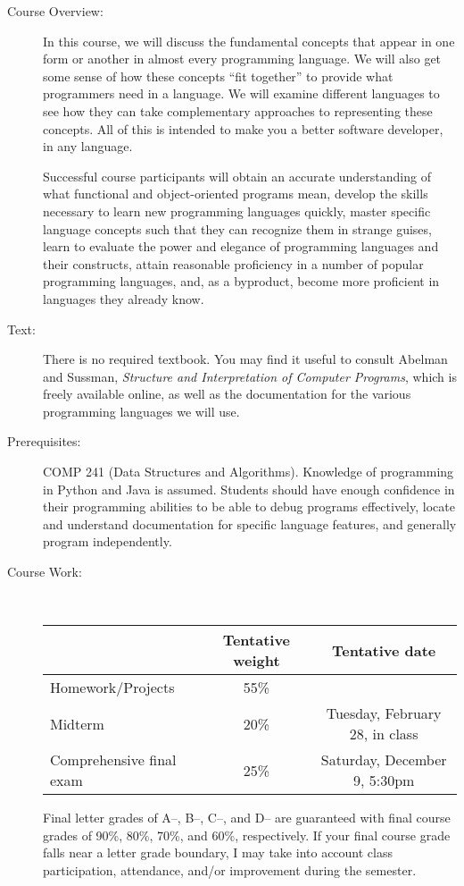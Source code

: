 \documentclass [letterpaper,11pt]{article}
\begin{document}
\begin{description}
\item[Course Overview:] In this course, we will discuss the fundamental concepts that appear in one form or another in almost every programming language.  We will also get some sense of how these concepts ``fit together''
to provide what programmers need in a
language. We will examine different languages to see how they can take complementary approaches to
representing these concepts.  All of this is intended to make you a better software developer, in any language.

Successful course participants will obtain an accurate understanding of what functional and object-oriented programs mean, develop the skills necessary to learn new programming languages quickly, master specific language concepts such that they can recognize them in strange guises, learn to evaluate the power and elegance of programming languages and their constructs, attain reasonable proficiency in a number of popular programming languages, 
and, as a byproduct, become
more proficient in languages they already know.

\item[Text:] There is no required textbook.  You may find it useful to consult Abelman and Sussman, 
	\textit{Structure and Interpretation of Computer Programs}, which is freely available online, as well as the documentation for the various programming
	languages we will use.

\item[Prerequisites:] COMP 241 (Data Structures and Algorithms).  Knowledge of programming
in Python and Java is assumed.  Students should have enough confidence in their
programming abilities to be able to debug programs effectively, locate and understand documentation for specific language features, and generally program independently.

\item[Course Work:] \

\begin{tabular}{lcc} 
& Tentative weight & Tentative date \\ \hline
Homework/Projects & 55\% & \\
Midterm & 20\% & Tuesday, February 28, in class\\
Comprehensive final exam & 25\% & Saturday, December 9, 5:30pm\\
\end{tabular}

Final letter grades of A--, B--, C--, and D-- are guaranteed with final course grades of 90\%, 80\%,
70\%, and 60\%, respectively.
If your final course grade falls near a letter grade boundary,
I may take into account class participation, attendance, and/or improvement during the semester.


\end{description}
\end{document}
